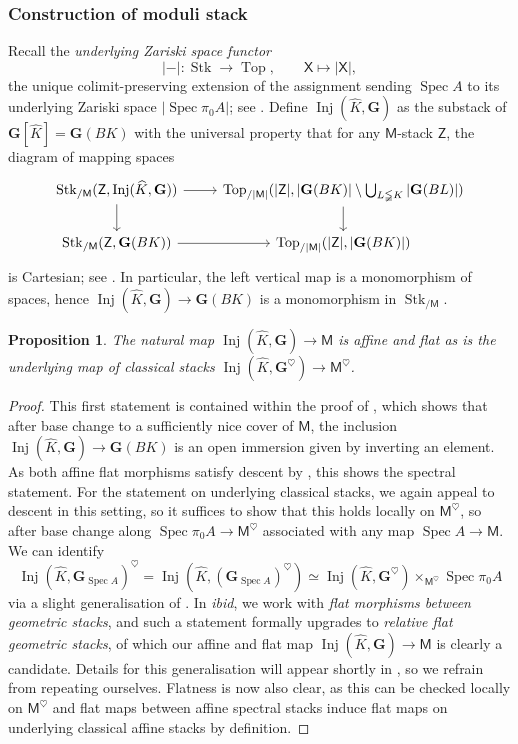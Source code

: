 \documentclass[11pt, a4paper]{article}
\DeclareMathOperator{\Spec}{Spec}
\newcommand{\1}{\mathbf{1}}
\DeclareMathOperator{\Inj}{Inj}
\DeclareMathOperator{\Stk}{Stk}
\DeclareMathOperator{\Top}{Top}
\newcommand{\dual}[1]{{\widehat{#1}}}
\newcommand{\G}{\mathbf{G}}
\newcommand{\M}{\mathsf{M}}
\newcommand{\X}{\mathsf{X}}
\newcommand{\sfZ}{\mathsf{Z}}
\theoremstyle{plain}
\newtheorem{prop}[equation]{Proposition}
\theoremstyle{definition}
\theoremstyle{remark}\numberwithin{equation}{section}
\begin{document}
\subsubsection{Construction of moduli stack}
Recall the \emph{underlying Zariski space functor}
\[|-|\colon \Stk \to \Top, \qquad \X \mapsto |\X|,\]
the unique colimit-preserving extension of the assignment sending $\Spec A$ to its underlying Zariski space $|\Spec \pi_0 A|$; see \cite[Con.5.5.1]{temperedglobal}. Define $\Inj(\dual{K}, \G)$ as the substack of $\G[\dual{K}] = \G(BK)$ with the universal property that for any $\M$-stack $\sfZ$, the diagram of mapping spaces
\[\begin{tikzcd}
    {{\Stk_{/\M}}(\sfZ,\Inj(\dual{K}, \G))}\ar[r]\ar[d]    &   {{\Top_{/|\M|}}(|\sfZ|, |\G(BK)| \setminus \bigcup_{L\lneqq K} |\G(BL)|)}\ar[d]    \\
    {{\Stk_{/\M}}(\sfZ,\G(BK))}\ar[r]    &   {{\Top_{/|\M|}}(|\sfZ|, |\G(BK)|)}
\end{tikzcd}\]
is Cartesian; see \cite[Cor.5.5.7 \& Def.5.5.10]{temperedglobal}. In particular, the left vertical map is a monomorphism of spaces, hence $\Inj(\dual{K}, \G) \to \G(BK)$ is a monomorphism in $\Stk_{/\M}$.

\begin{prop}
    The natural map $\Inj(\dual{K}, \G) \to \M$ is affine and flat as is the underlying map of classical stacks $\Inj(\dual{K}, \G^\heartsuit) \to \M^\heartsuit$.
\end{prop}

\begin{proof}
    This first statement is contained within the proof of \cite[Cor.5.5.17]{temperedglobal}, which shows that after base change to a sufficiently nice cover of $\M$, the inclusion $\Inj(\dual{K}, \G) \to \G(BK)$ is an open immersion given by inverting an element. As both affine flat morphisms satisfy descent by , this shows the spectral statement. For the statement on underlying classical stacks, we again appeal to descent in this setting, so it suffices to show that this holds locally on $\M^\heartsuit$, so after base change along $\Spec \pi_0 A \to \M^\heartsuit$ associated with any map $\Spec A \to \M$. We can identify
\[\Inj(\dual{K}, \G_{\Spec A})^\heartsuit = \Inj(\dual{K}, (\G_{\Spec A})^\heartsuit) \simeq \Inj(\dual{K}, \G^\heartsuit) \times_{\M^\heartsuit} \Spec \pi_0 A\]
via a slight generalisation of \cite[Pr.3.4.3.3]{reconstruction}. In \emph{ibid}, we work with \emph{flat morphisms between geometric stacks}, and such a statement formally upgrades to \emph{relative flat geometric stacks}, of which our affine and flat map $\Inj(\dual{K}, \G) \to \M$ is clearly a candidate. Details for this generalisation will appear shortly in \cite{geometricnorms}, so we refrain from repeating ourselves. Flatness is now also clear, as this can be checked locally on $\M^\heartsuit$ and flat maps between affine spectral stacks induce flat maps on underlying classical affine stacks by definition.
\end{proof}
\end{document}
